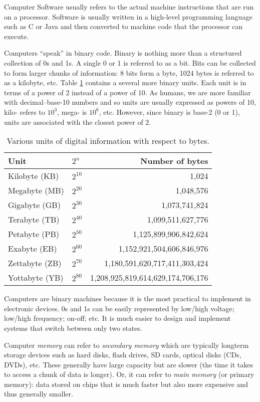 Computer Software usually refers to the actual machine instructions
that are run on a processor.  Software is usually written in a high-level
programming language such as C or Java and then converted to 
machine code that the processor can execute.

Computers ``speak'' in binary code.  Binary is nothing more than a 
structured collection of 0s and 1s.  A single 0 or 1 is referred to as a \gls{bit}.  
Bits can be collected to form larger chunks of information: 8 bits form 
a \gls{byte}, 1024 bytes is referred to as a kilobyte, etc.  Table 
\ref{table:memoryUnits} contains a several more binary units.
Each unit is in terms of a power of 2 instead of a power of 10.  
As humans, we are more familiar with decimal--base-10 numbers
and so units are usually expressed as powers of 10, kilo- refers
to $10^3$, mega- is $10^6$, etc.  However, since binary is base-2
(0 or 1), units are associated with the closest power of 2.

\begin{table}
\centering
\begin{tabular}{l|l|r}
Unit & $2^n$ & Number of bytes \\
\hline\hline
Kilobyte (KB) & $2^{10}$ & 1,024 \\
Megabyte (MB) & $2^{20}$ & 1,048,576 \\
Gigabyte (GB) & $2^{30}$ & 1,073,741,824 \\
Terabyte (TB) & $2^{40}$ & 1,099,511,627,776 \\
Petabyte (PB) & $2^{50}$ & 1,125,899,906,842,624 \\
Exabyte (EB) & $2^{60}$ &  1,152,921,504,606,846,976\\
Zettabyte (ZB) & $2^{70}$ &  1,180,591,620,717,411,303,424\\
Yottabyte (YB) & $2^{80}$ &  1,208,925,819,614,629,174,706,176\\
\end{tabular}
\caption{Various units of digital information with respect to bytes.}
\label{table:memoryUnits}
\end{table}

Computers are binary machines because it is the most practical to
implement in electronic devices.  0s and 1s can be easily represented
by low/high voltage; low/high frequency; on-off; etc.  It is much easier
to design and implement systems that switch between only two states.

Computer \emph{memory} can refer to \emph{secondary memory}
which are typically longterm storage devices such as hard disks, flash 
drives, SD cards, optical disks (CDs, DVDs), etc. These generally have
large capacity but are slower (the time it takes to 
access a chunk of data is longer).  Or, it can refer to \emph{main memory}
(or primary memory): data stored on chips that is much faster but also
more expensive and thus generally smaller.

